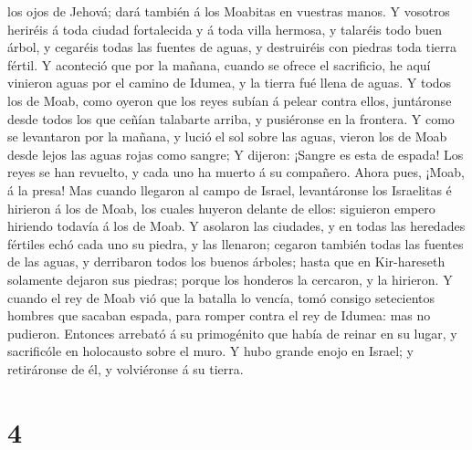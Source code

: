 los ojos de Jehová; dará también á los Moabitas en vuestras manos.
 Y vosotros heriréis á toda ciudad fortalecida y á toda
villa hermosa, y talaréis todo buen árbol, y cegaréis todas las fuentes
de aguas, y destruiréis con piedras toda tierra fértil. 
Y aconteció que por la mañana, cuando se ofrece el sacrificio, he aquí
vinieron aguas por el camino de Idumea, y la tierra fué llena de aguas.
 Y todos los de Moab, como oyeron que los reyes subían á
pelear contra ellos, juntáronse desde todos los que ceñían talabarte
arriba, y pusiéronse en la frontera.  Y como se
levantaron por la mañana, y lució el sol sobre las aguas, vieron los de
Moab desde lejos las aguas rojas como sangre;  Y dijeron:
¡Sangre es esta de espada! Los reyes se han revuelto, y cada uno ha
muerto á su compañero. Ahora pues, ¡Moab, á la presa! 
Mas cuando llegaron al campo de Israel, levantáronse los Israelitas é
hirieron á los de Moab, los cuales huyeron delante de ellos: siguieron
empero hiriendo todavía á los de Moab.  Y asolaron las
ciudades, y en todas las heredades fértiles echó cada uno su piedra, y
las llenaron; cegaron también todas las fuentes de las aguas, y
derribaron todos los buenos árboles; hasta que en Kir-hareseth solamente
dejaron sus piedras; porque los honderos la cercaron, y la hirieron.
 Y cuando el rey de Moab vió que la batalla lo vencía,
tomó consigo setecientos hombres que sacaban espada, para romper contra
el rey de Idumea: mas no pudieron.  Entonces arrebató á
su primogénito que había de reinar en su lugar, y sacrificóle en
holocausto sobre el muro. Y hubo grande enojo en Israel; y retiráronse
de él, y volviéronse á su tierra.

\hypertarget{section-3}{%
\section{4}\label{section-3}}

